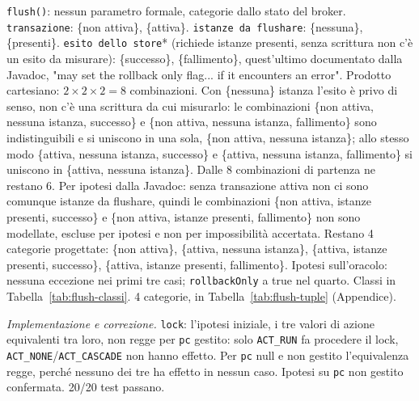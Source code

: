 \texttt{flush()}: nessun parametro formale, categorie dallo stato del broker. \texttt{transazione}:
\{non attiva\}, \{attiva\}. \texttt{istanze da flushare}: \{nessuna\}, \{presenti\}.
\texttt{esito dello store}* (richiede istanze presenti, senza scrittura non c'è un esito da
misurare): \{successo\}, \{fallimento\}, quest'ultimo documentato dalla Javadoc, "may set the
rollback only flag... if it encounters an error". Prodotto cartesiano: $2 \times 2 \times 2 = 8$
combinazioni. Con \{nessuna\} istanza l'esito è privo di senso, non c'è una scrittura da cui
misurarlo: le combinazioni \{non attiva, nessuna istanza, successo\} e \{non attiva, nessuna
istanza, fallimento\} sono indistinguibili e si uniscono in una sola, \{non attiva, nessuna
istanza\}; allo stesso modo \{attiva, nessuna istanza, successo\} e \{attiva, nessuna istanza,
fallimento\} si uniscono in \{attiva, nessuna istanza\}. Dalle 8 combinazioni di partenza ne
restano 6. Per ipotesi dalla Javadoc: senza transazione attiva non ci sono comunque istanze
da flushare, quindi le combinazioni \{non attiva, istanze presenti, successo\} e \{non attiva,
istanze presenti, fallimento\} non sono modellate, escluse per ipotesi e non per impossibilità
accertata. Restano 4 categorie progettate: \{non attiva\},
\{attiva, nessuna istanza\}, \{attiva, istanze presenti, successo\}, \{attiva, istanze presenti,
fallimento\}. Ipotesi sull'oracolo: nessuna eccezione nei primi tre casi; \texttt{rollbackOnly} a
true nel quarto. Classi in Tabella~\ref{tab:flush-classi}. 4 categorie, in Tabella~\ref{tab:flush-tuple} (Appendice).

\textit{Implementazione e correzione.} \texttt{lock}: l'ipotesi iniziale, i tre valori di azione
equivalenti tra loro, non regge per \texttt{pc} gestito: solo \texttt{ACT\_RUN} fa procedere il
lock, \texttt{ACT\_NONE}/\texttt{ACT\_CASCADE} non hanno effetto. Per \texttt{pc} null e non
gestito l'equivalenza regge, perché nessuno dei tre ha effetto in nessun caso. Ipotesi su
\texttt{pc} non gestito confermata. 20/20 test passano.

